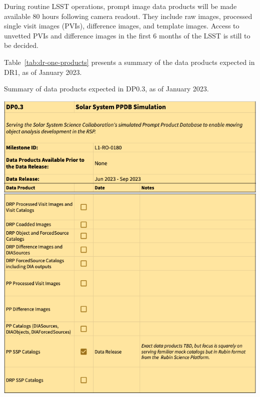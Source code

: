 During routine LSST operations, prompt image data products will be made available 80 hours following camera readout.
They include raw images, processed single visit images (PVIs), difference images, and template images.
Access to unvetted PVIs and difference images in the first 6 months of the LSST is still to be decided.

Table~\ref{tab:dr-one-products} presents a summary of the data products expected in DR1, as of January 2023.


\begin{table}[ht]
\centering
\label{tab:dp-zero-three-products}
\caption{Summary of data products expected in DP0.3, as of January 2023.}
\includegraphics[width=0.9\linewidth]{figures/DP0_3-products.png}
\end{table}

